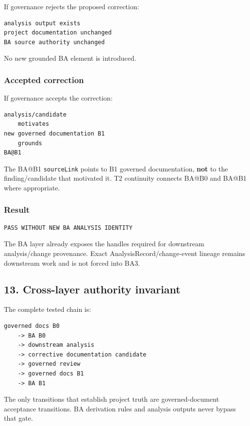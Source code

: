 \documentclass[11pt,a4paper]{article}
\begin{document}
If governance rejects the proposed correction:

\begin{verbatim}
analysis output exists
project documentation unchanged
BA source authority unchanged
\end{verbatim}

No new grounded BA element is introduced.

\subsubsection{Accepted correction}\label{accepted-correction}

If governance accepts the correction:

\begin{verbatim}
analysis/candidate
    motivates
new governed documentation B1
    grounds
BA@B1
\end{verbatim}

The BA@B1 \texttt{sourceLink} points to B1 governed documentation,
\textbf{not} to the finding/candidate that motivated it. T2 continuity
connects BA@B0 and BA@B1 where appropriate.

\subsubsection{Result}\label{result-4}

\begin{verbatim}
PASS WITHOUT NEW BA ANALYSIS IDENTITY
\end{verbatim}

The BA layer already exposes the handles required for downstream
analysis/change provenance. Exact AnalysisRecord/change-event lineage
remains downstream work and is not forced into BA3.

\subsection{13. Cross-layer authority
invariant}\label{cross-layer-authority-invariant}

The complete tested chain is:

\begin{verbatim}
governed docs B0
    -> BA B0
    -> downstream analysis
    -> corrective documentation candidate
    -> governed review
    -> governed docs B1
    -> BA B1
\end{verbatim}

The only transitions that establish project truth are governed-document
acceptance transitions. BA derivation rules and analysis outputs never
bypass that gate.
\end{document}
